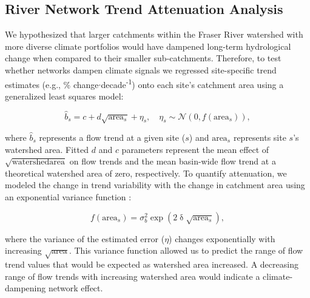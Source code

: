 \documentclass[linenumbers,draft]{AGUJournal}
\begin{document}
\subsection{River Network Trend Attenuation Analysis}
We hypothesized that larger catchments within the Fraser River watershed with more diverse climate portfolios would have dampened long-term hydrological change when compared to their smaller sub-catchments. Therefore, to test whether networks dampen climate signals we regressed site-specific trend estimates (e.g., \% change$\cdot$decade\textsuperscript{-1}) onto each site's catchment area using a generalized least squares model:
\begin{linenomath*}
\begin{equation}
	\hat{b}_{s} = c + d\sqrt{\mathrm{area}_{s}} + \eta_{s}, \quad
  \eta_{s} \sim \mathcal{N}(0, f(\mathrm{area}_{s})) \label{eq2},
\end{equation}
\end{linenomath*}
where $\hat{b}_{s}$ represents a flow trend at a given site ($s$) and $\mathrm{area}_{s}$ represents site $s$'s watershed area. Fitted $d$ and $c$ parameters represent the mean effect of $\sqrt{\mathrm{watershed area}}$ on flow trends and the mean basin-wide flow trend at a theoretical watershed area of zero, respectively. To quantify attenuation, we modeled the change in trend variability with the change in catchment area using an exponential variance function \citep[p.~211]{Pinheiro:2006}: 
\begin{linenomath*}
\begin{equation}
	f(\mathrm{area}_{s})=\sigma_b^2 \exp(2\updelta\sqrt{\mathrm{area}_{s}}) \label{eq3},
\end{equation}
\end{linenomath*} 
where the variance of the estimated error ($\eta$) changes exponentially with increasing $\sqrt{\mathrm{area}}$. This variance function allowed us to predict the range of flow trend values that would be expected as watershed area increased. A decreasing range of flow trends with increasing watershed area would indicate a climate-dampening network effect.
\end{document}
